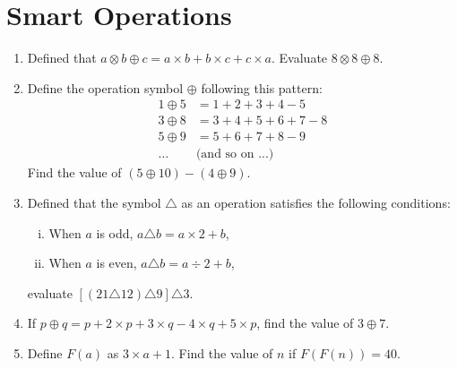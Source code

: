 \documentclass[11pt]{scrartcl}
\begin{document}
\newpage
\section{Smart Operations}
\begin{enumerate}[resume]
    \item Defined that $a \otimes b \oplus c = a \times b + b \times c + c \times a$. Evaluate $8 \otimes 8 \oplus 8$.

    \vspace{8cm}\item Define the operation symbol $\oplus$ following this pattern:
    \begin{align*}
        1 \oplus 5 &= 1 + 2 + 3 + 4 - 5\\
        3 \oplus 8 &= 3 + 4 + 5 + 6 + 7 - 8\\
        5 \oplus 9 &= 5 + 6 + 7 + 8 - 9\\
        \dots& \text{(and so on ...)}
    \end{align*}
    Find the value of $(5 \oplus 10) - (4 \oplus 9).$
    
    \vspace{16cm}\item Defined that the symbol $\triangle$ as an operation satisfies the following conditions:
    \begin{enumerate}[(i)]
        \item When $a$ is odd, $a \triangle b = a \times 2 + b$,
        \item When $a$ is even, $a \triangle b = a \div 2 + b$,
    \end{enumerate}
    evaluate $[(21 \triangle 12) \triangle 9] \triangle 3$.

    \vspace{8cm}\item If $p \oplus q = p + 2 \times p + 3 \times q - 4 \times q + 5 \times p$, find the value of $3 \oplus 7$.

    \vspace{8cm}\item Define $F(a)$ as $3 \times a+1$. Find the value of $n$ if $F(F(n))=40$.
\end{enumerate}

\newpage
\end{document}
